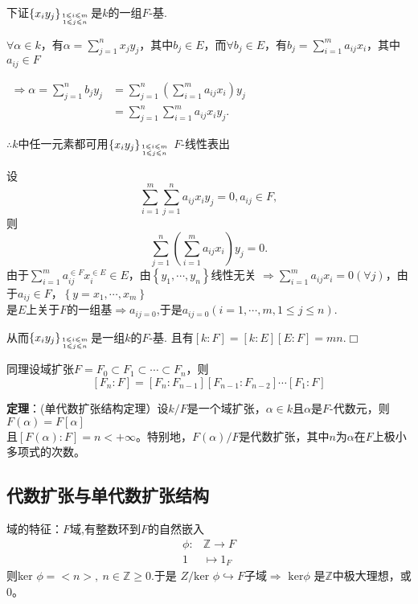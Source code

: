 \documentclass[UTF8]{article}
\begin{document}
下证$\left\{ x_iy_j\right\}_{1\leqslant i\leqslant m\atop 1\leqslant j\leqslant n}$是$k$的一组$F$-基.

$\forall\alpha\in k$，有$\alpha=\sum\limits_{j=1}^{n} x_{j} y_{j}$，其中$b_j\in E$，而$\forall b_j\in E$，有$b_j=\sum\limits_{i=1}^{m} a_{ij}x_i$，其中$a_{ij}\in F$
\begin{center}
	
	$\begin{aligned} \Rightarrow\alpha=\sum\limits_{j=1}^{n} b_{j} y_{j} &=\sum\limits_{j=1}^{n}\left(\sum\limits_{i=1}^{m} a_{i j} x_{i}\right) y_{j} \\ &=\sum\limits_{j=1}^{n} \sum\limits_{i=1}^{m} a_{i j} x_{i} y_{j} .\end{aligned}$
\end{center}
$\therefore k$中任一元素都可用$\left\{ x_iy_j\right\}_{1\leqslant i\leqslant m\atop 1\leqslant j\leqslant n}$ $F$-线性表出

设
$$\sum\limits_{i=1}^{m} \sum\limits_{j=1}^{n} a_{i j} x_{i}  y_{j}=0, a_{ij}\in F,$$
则
$$\sum\limits_{j=1}^{n}\left(\sum\limits_{i=1}^{m} a_{ij} x_{i}\right) y_{j}=0.$$
由于$\sum\limits_{i=1}^ma_{ij}^{\in F}x_i^{\in E}\in E$，由$\left\{ y_1,\cdots,y_n\right\}$线性无关
$\Rightarrow\sum\limits_{i=1}^{m} a_{ij} x_{i}=0(\forall j)$，由于$a_{ij}\in F$，$\left\{ y=x_1,\cdots,x_m\right\}$\\是$E$上关于$F$的一组基$\Rightarrow a_{ij=0}$,于是$a_{ij=0}(i=1,\cdots, m, 1\leqslant j\leqslant n)$.

从而$\left\{ x_iy_j\right\}_{1\leqslant i\leqslant m\atop 1\leqslant j\leqslant n}$是一组$k$的$F$-基.
且有$[k: F]=[k: E][E: F]=mn.$\hfill$\Box$

同理设域扩张$F=F_0\subset F_1\subset \cdots \subset F_n$，则
$$
[F_n: F]=[F_n: F_{n-1}][F_{n-1}: F_{n-2}]\cdots [F_1: F]
$$

\textbf{定理}：(单代数扩张结构定理）设$k/F$是一个域扩张，$\alpha\in k$且$\alpha$是$F$-代数元，则$F(\alpha)=F[\alpha]$\\且$[F(\alpha): F]=n<+\infty$。特别地，$F(\alpha)/F$是代数扩张，其中$n$为$\alpha$在$F$上极小多项式的次数。

\subsection{代数扩张与单代数扩张结构}

域的特征：$F$域,有整数环到$F$的自然嵌入
\[
\begin{split}
\phi:&\mathbb{Z} \rightarrow F\\
1 &\mapsto 1_{F}
\end{split}
\]
则ker $\phi=<n>,\ n\in\mathbb{Z}\geqslant 0$.于是
$Z/\text{ker }\phi\hookrightarrow F$子域$\Rightarrow\text{ ker}\phi$ 是$\mathbb{Z}$中极大理想，或0。
\end{document}
